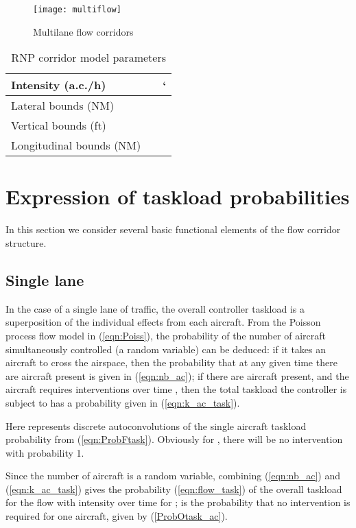 \documentclass[conference]{IEEEtran}
\begin{document}
\begin{figure}[!h]
\centering
\texttt{[image: multiflow]}
\caption{Multilane flow corridors}
\label{fig:multiflow}
\end{figure}

\begin{table}
\caption{RNP corridor model parameters}
\label{tab:flow_param}
\centering
\begin{tabular}{|l|ll|}
\hline\hline
Intensity (a.c./h) 			&   	&` \bigstrut\\ \hline
Lateral bounds (NM) 		&  				&  \bigstrut \\ \hline
Vertical bounds (ft) 		&  					& \bigstrut \\ \hline
Longitudinal bounds (NM)&  					&  \bigstrut\\ \hline\hline
\end{tabular}
\end{table}

\section{Expression of taskload probabilities}
\label{sec:analytic}

In this section we consider several basic functional elements of the flow corridor structure.

\subsection{Single lane}
\label{sec:1lane}
In the case of a single lane of traffic, the overall controller taskload is a superposition of the individual effects from each aircraft. From the Poisson process flow model in (\ref{eqn:Poiss}), the probability of the number of aircraft  simultaneously controlled (a random variable) can be deduced: if it takes an aircraft  to cross the airspace, then the probability that at any given time there are  aircraft present is given in (\ref{eqn:nb_ac}); if there are  aircraft present, and the aircraft  requires  interventions over time , then the total taskload the controller is subject to has a probability given in (\ref{eqn:k_ac_task}).


Here  represents  discrete autoconvolutions of the single aircraft taskload probability  from (\ref{eqn:ProbFtask}). Obviously for , there will be no intervention with probability 1.



Since the number of aircraft is a random variable, combining (\ref{eqn:nb_ac}) and (\ref{eqn:k_ac_task}) gives the probability (\ref{eqn:flow_task}) of the overall taskload  for the flow with intensity  over time  for ;  is the probability that no intervention is required for one aircraft, given by (\ref{ProbOtask_ac}).
\end{document}
